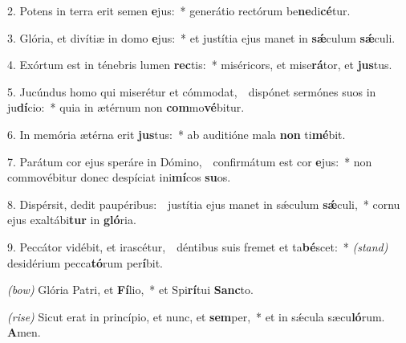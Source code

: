 2. Potens in terra erit semen \textbf{e}jus:~*
	generátio rectórum be\textbf{ne}di\textbf{cé}tur.

3. Glória, et divítiæ in domo \textbf{e}jus:~*
	et justítia ejus manet in \textbf{s\'{\ae}}culum \textbf{s\'{\ae}}culi.

4. Exórtum est in ténebris lumen \textbf{rec}tis:~*
	miséricors, et mise\textbf{rá}tor, et \textbf{jus}tus.

5. Jucúndus homo qui miserétur et cómmodat,~\GreDagger\
	dispónet sermónes suos in ju\textbf{dí}cio:~*
	quia in ætérnum non \textbf{com}mo\textbf{vé}bitur.

6. In memória ætérna erit \textbf{jus}tus:~*
	ab auditióne mala \textbf{non} ti\textbf{mé}bit.

7. Parátum cor ejus speráre in Dómino,~\GreDagger\
	confirmátum est cor \textbf{e}jus:~*
	non commovébitur donec despíciat ini\textbf{mí}cos \textbf{su}os.

8. Dispérsit, dedit paupéribus:~\GreDagger\
	justítia ejus manet in s\'{\ae}culum \textbf{s\'{\ae}}\-culi,~*
	cornu ejus exaltábi\textbf{tur} in \textbf{gló}ria.

9. Peccátor vidébit, et irascétur,~\GreDagger\
	déntibus suis fremet et ta\textbf{bé}scet:~* {\color{red}\textit{(stand)}}
	desidérium pecca\textbf{tó}rum per\textbf{í}bit.
	
{\color{red}\textit{(bow)}} Glória Patri, et \textbf{Fí}lio,~*
	et Spi\textbf{rí}tui \textbf{Sanc}to.

{\color{red}\textit{(rise)}} Sicut erat in princípio, et nunc, et \textbf{sem}per,~*
	et in s\'{\ae}cula sæcu\textbf{ló}rum. \textbf{A}men.